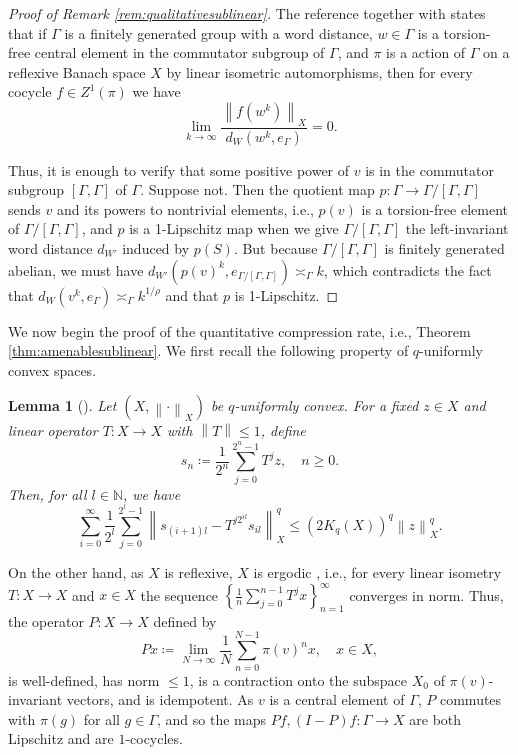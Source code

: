 \documentclass[11pt,reqno]{amsart}
\newtheorem{lemma}[theorem]{Lemma}
\newcommand{\1}{\mathbf 1}
\begin{document}
\begin{proof}[Proof of Remark \ref{rem:qualitativesublinear}]
    The reference \cite[Proposition 3.5]{das2016integrable} together with \cite[Example 3.3]{das2016integrable} states that if $\Gamma$ is a finitely generated group with a word distance, $w\in \Gamma$ is a torsion-free central element in the commutator subgroup of $\Gamma$, and $\pi$ is a action of $\Gamma$ on a reflexive Banach space $X$ by linear isometric automorphisms, then for every cocycle $f\in Z^1\left(\pi\right)$ we have
    \[
    \lim_{k\to\infty}\frac{\left\|f\left(w^k\right)\right\|_X}{d_W\left(w^k,e_\Gamma\right)}=0.
    \]
    
    Thus, it is enough to verify that some positive power of $v$ is in the commutator subgroup $\left[\Gamma,\Gamma\right] $ of $\Gamma$. Suppose not. Then the quotient map $p:\Gamma\to\Gamma/\left[\Gamma,\Gamma\right]$ sends $v$ and its powers to nontrivial elements, i.e., $p\left(v\right)$ is a torsion-free element of $\Gamma/\left[\Gamma,\Gamma\right]$, and $p$ is a 1-Lipschitz map when we give $\Gamma/\left[\Gamma,\Gamma\right]$ the left-invariant word distance $d_{W'}$ induced by $p\left(S\right)$. But because $\Gamma/\left[\Gamma,\Gamma\right]$ is finitely generated abelian, we must have $d_{W'}\left(p\left(v\right)^k,e_{\Gamma/\left[\Gamma,\Gamma\right]}\right)\asymp_\Gamma k$, which contradicts the fact that $d_W\left(v^k,e_\Gamma\right)\asymp_\Gamma k^{1/\rho}$ and that $p$ is 1-Lipschitz.
\end{proof}

We now begin the proof of the quantitative compression rate, i.e., Theorem \ref{thm:amenablesublinear}. We first recall the following property of $q$-uniformly convex spaces.

\begin{lemma}[{\cite[Lemma 3.1]{austin2013sharp}}]\label{lem:unifcvxseq}
Let $\left(X,\left\|\cdot\right\|_X\right)$ be $q$-uniformly convex. For a fixed $z\in X$ and linear operator $T:X\to X$ with $\left\|T\right\|\le 1$, define
\[
s_n\coloneqq \frac {1}{2^n} \sum_{j=0}^{2^n-1} T^jz,\quad n\ge 0.
\]
Then, for all $l\in \mathbb{N}$, we have
\begin{equation}\label{unifcvxseq}
\sum_{i=0}^\infty \frac{1}{2^l}\sum_{j=0}^{2^l-1}\left\|s_{\left(i+1\right)l}-T^{j2^{il}}s_{il}\right\|_X^q\le \left(2K_q\left(X\right)\right)^q\left\|z\right\|_X^q.
\end{equation}
\end{lemma}

On the other hand, as $X$ is reflexive, $X$ is ergodic \cite[p.662]{dunford1988linear}, i.e., for every linear isometry $T:X\to X$ and $x\in X$ the sequence $\left\{\frac 1n \sum_{j=0}^{n-1} T^jx\right\}_{n=1}^\infty$ converges in norm. Thus, the operator $P:X\to X$ defined by
\[
Px\coloneqq \lim_{N\to\infty} \frac 1N \sum_{n=0}^{N-1}\pi\left(v\right)^n x,\quad x\in X,
\]
is well-defined, has norm $\le 1$, is a contraction onto the subspace $X_0$ of $\pi\left(v\right)$-invariant vectors, and is idempotent. As $v$ is a central element of $\Gamma$, $P$ commutes with $\pi\left(g\right)$ for all $g\in \Gamma$, and so the maps $Pf,\left(I-P\right)f:\Gamma\to X$ are both Lipschitz and are $1$-cocycles.
\end{document}
